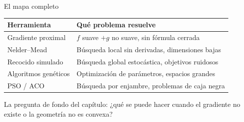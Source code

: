 \documentclass[10pt,aspectratio=169]{beamer}
\begin{document}
\begin{frame}{El mapa completo}
  \centering
  \small
  \vspace{2mm}
  \begin{tabular}{@{}p{}p{}@{}}
    \toprule
    \textbf{Herramienta} & \textbf{Qué problema resuelve} \\
    \midrule
    Gradiente proximal & $f$ suave $+ g$ no suave, sin fórmula cerrada \\
    Nelder--Mead & Búsqueda local sin derivadas, dimensiones bajas \\
    Recocido simulado & Búsqueda global estocástica, objetivos ruidosos \\
    Algoritmos genéticos & Optimización de parámetros, espacios grandes \\
    PSO / ACO & Búsqueda por enjambre, problemas de caja negra \\
    \bottomrule
  \end{tabular}
  \vspace{4mm}
  {\footnotesize\color{gray}
    La pregunta de fondo del capítulo: ¿qué se puede hacer cuando el
    gradiente no existe o la geometría no es convexa?}
\end{frame}
\end{document}

